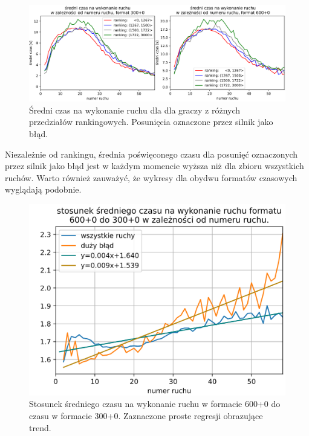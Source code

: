 \documentclass[inzynierska]{pwr_wmat_praca_dyplomowa}
\theoremstyle{plain}
\numberwithin{theorem}{chapter}
\theoremstyle{definition}
\numberwithin{theorem}{chapter}
\begin{document}
\begin{figure}[h]
	\centering
	\includegraphics[width=\textwidth]{sr_czas_na_ruch_ELO_2.png}
	\caption{Średni czas na wykonanie ruchu dla dla graczy z różnych przedziałów rankingowych. Posunięcia oznaczone przez silnik jako błąd.}
	\label{rys:sr_czas_na_ruch_ELO_2}
\end{figure}
Niezależnie od rankingu, średnia poświęconego czasu dla posunięć oznaczonych przez silnik jako błąd jest w każdym momencie wyższa niż dla zbioru wszystkich ruchów. 
Warto również zauważyć, że wykresy dla obydwu formatów czasowych wyglądają podobnie. 
\begin{figure}[h]
	\centering
	\includegraphics[width=\textwidth]{stosunek_sr_czas.png}
	\caption{Stosunek średniego czasu na wykonanie ruchu w formacie 600+0 do czasu w formacie 300+0. Zaznaczone proste regresji obrazujące trend.}
	\label{rys:stosunek_sr_czas}
\end{figure}
\end{document}
